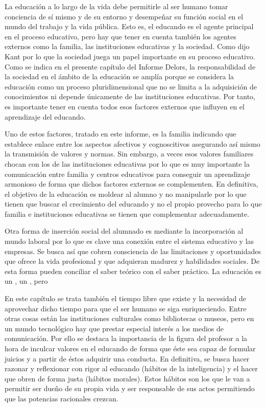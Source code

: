 La educación a lo largo de la vida debe permitirle al ser humano tomar conciencia de sí mismo y de su entorno y desempeñar su función social en el mundo del trabajo y la vida pública.
%
Esto es, el educando es el agente principal en el proceso educativo, pero hay que tener en cuenta también los agentes externos como la familia, las instituciones educativas y la sociedad.
%
Como dijo Kant  por lo que la sociedad juega un papel importante en su proceso educativo.
%
Como se indica en el presente capítulo del Informe Delors, la responsabilidad de la sociedad en el ámbito de la educación se amplía porque se considera la educación como un proceso pluridimensional que no se limita a la adquisición de conocimientos ni depende únicamente de las instituciones educativas.
%
Por tanto, es importante tener en cuenta todos esos factores externos que influyen en el aprendizaje del educando.

Uno de estos factores, tratado en este informe, es la familia indicando que establece enlace entre los aspectos afectivos y cognoscitivos asegurando así mismo la transmisión de valores y normas.
%
Sin embargo, a veces esos valores familiares chocan con los de las instituciones educativas por lo que es muy importante la comunicación entre familia y centros educativos para conseguir un aprendizaje armonioso de forma que dichos factores externos se complementen.
%
En definitiva, el objetivo de la educación es moldear al alumno y no manipularle por lo que tienen que buscar el crecimiento del educando y no el propio provecho para lo que familia e instituciones educativas se tienen que complementar adecuadamente.


Otra forma de inserción social del alumnado es mediante la incorporación al mundo laboral por lo que es clave una conexión entre el sistema educativo y las empresas.
%
Se busca así que cobren consciencia de las limitaciones y oportunidades que ofrece la vida profesional y que adquieran madurez y habilidades sociales.
%
De esta forma pueden conciliar el saber teórico con el saber práctico.
%
La educación es un , un , pero 


En este capítulo se trata también el tiempo libre que existe y la necesidad de aprovechar dicho tiempo para que el ser humano se siga enriqueciendo.
%
Entre otras cosas están las instituciones culturales como bibliotecas o museos, pero en un mundo tecnológico hay que prestar especial interés a los medios de comunicación.
%
Por ello se destaca la importancia de la figura del profesor a la hora de inculcar valores en el educando de forma que éste sea capaz de formular juicios y a partir de éstos adquirir una conducta.
%
En definitiva, se busca hacer razonar y reflexionar con rigor al educando (hábitos de la inteligencia) y el hacer que obren de forma justa (hábitos morales).
%
Estos hábitos son los que le van a permitir ser dueño de su propia vida y ser responsable de sus actos permitiendo que las potencias racionales crezcan.


